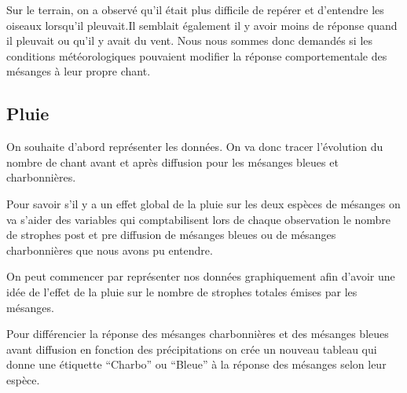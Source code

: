 \documentclass[
  french,
]{article}
\newenvironment{Shaded}{\begin{snugshade}}{\end{snugshade}}
\newcommand{\AttributeTok}[1]{\textcolor[rgb]{0.13,0.29,0.53}{#1}}
\newcommand{\FunctionTok}[1]{\textcolor[rgb]{0.13,0.29,0.53}{\textbf{#1}}}
\newcommand{\NormalTok}[1]{#1}
\newcommand{\OtherTok}[1]{\textcolor[rgb]{0.56,0.35,0.01}{#1}}
\newcommand{\SpecialCharTok}[1]{\textcolor[rgb]{0.81,0.36,0.00}{\textbf{#1}}}
\newcommand{\StringTok}[1]{\textcolor[rgb]{0.31,0.60,0.02}{#1}}
\begin{document}
Sur le terrain, on a observé qu'il était plus difficile de repérer et
d'entendre les oiseaux lorsqu'il pleuvait.Il semblait également il y
avoir moins de réponse quand il pleuvait ou qu'il y avait du vent. Nous
nous sommes donc demandés si les conditions météorologiques pouvaient
modifier la réponse comportementale des mésanges à leur propre chant.

\subsection{Pluie}\label{pluie}

On souhaite d'abord représenter les données. On va donc tracer
l'évolution du nombre de chant avant et après diffusion pour les
mésanges bleues et charbonnières.

Pour savoir s'il y a un effet global de la pluie sur les deux espèces de
mésanges on va s'aider des variables qui comptabilisent lors de chaque
observation le nombre de strophes post et pre diffusion de mésanges
bleues ou de mésanges charbonnières que nous avons pu entendre.

On peut commencer par représenter nos données graphiquement afin d'avoir
une idée de l'effet de la pluie sur le nombre de strophes totales émises
par les mésanges.

Pour différencier la réponse des mésanges charbonnières et des mésanges
bleues avant diffusion en fonction des précipitations on crée un nouveau
tableau qui donne une étiquette ``Charbo'' ou ``Bleue'' à la réponse des
mésanges selon leur espèce.

\begin{Shaded}
\end{Shaded}
\end{document}

